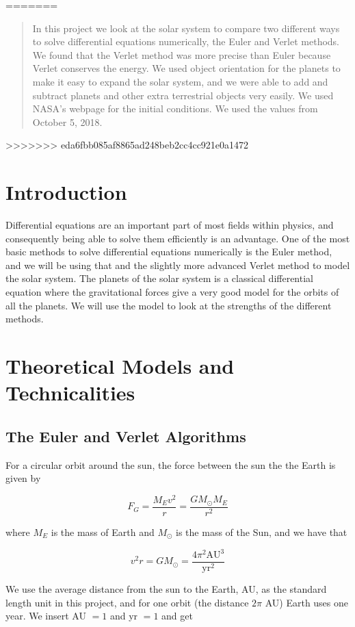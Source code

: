 \documentclass{article}
\begin{document}
=======
\begin{abstract}
In this project we look at the solar system to compare two different ways to solve differential equations numerically, the Euler and Verlet methods. We found that the Verlet method was more precise than Euler because Verlet conserves the energy. We used object orientation for the planets to make it easy to expand the solar system, and we were able to add and subtract planets and other extra terrestrial objects very easily. We used NASA's webpage \cite{NASA} for the initial conditions. We used the values from October 5, 2018.
\end{abstract}
>>>>>>> eda6fbb085af8865ad248beb2cc4cc921e0a1472

\section{Introduction}
Differential equations are an important part of most fields within physics, and consequently being able to solve them efficiently is an advantage. One of the most basic methods to solve differential equations numerically is the Euler method, and we will be using that and the slightly more advanced Verlet method to model the solar system. The planets of the solar system is a classical differential equation where the gravitational forces give a very good model for the orbits of all the planets. We will use the model to look at the strengths of the different methods.


\section{Theoretical Models and Technicalities}

\subsection{The Euler and Verlet Algorithms}

For a circular orbit around the sun, the force between the sun the the Earth is given by

$$F_G=\frac{M_Ev^2}{r}=\frac{GM_{\odot}M_E}{r^2}$$

where $M_E$ is the mass of Earth and $M_{\odot}$ is the mass of the Sun, and we have that

$$v^2r=GM_{\odot}=\frac{4\pi^2\mathrm{AU}^3}{\mathrm{yr}^2}$$

We use the average distance from the sun to the Earth, AU, as the standard length unit in this project, and for one orbit (the distance $2\pi$ AU) Earth uses one year. We insert AU $=1$ and yr $=1$ and get
\end{document}
